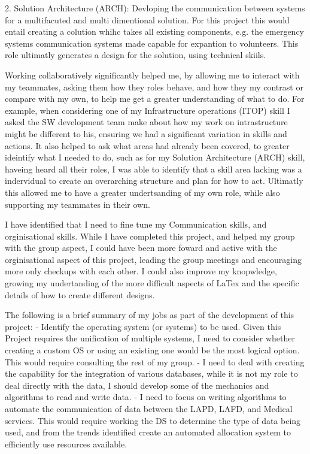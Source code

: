 \documentclass[a4paper, 11pt]{report}
\begin{document}
2. Solution Architecture (ARCH): Devloping the communication between systems for a multifacuted and multi dimentional solution. For this project this would entail creating a colution whihc takes all existing components, e.g. the emergency systems communication systems made capable for expantion to volunteers. This role ultimatly generates a design for the solution, using technical skiils. 

Working collaboratively significantly helped me, by allowing me to interact with my teammates, asking them how they roles behave, and how they my contrast or compare with my own, to help me get a greater understanding of what to do. For example, when considering one of my Infrastructure operations (ITOP) skill I asked the SW development team make about how my work on intrastructure might be different to his, ensuring we had a significant variation in skills and actions. It also helped to ask what areas had already been covered, to greater ideintify what I needed to do, such as for my Solution Architecture (ARCH) skill, haveing heard all their roles, I was able to identify that a skill area lacking was a indervidual to create an overarching structure and plan for how to act. Ultimatly this allowed me to have a greater undertsanding of my own role, while also  supporting my teammates in their own. 

I have identified that I need to fine tune my Communication skills, and orginisational skills. While I have completed this project, and helped my group with the group aspect, I could have been more foward and active with the orginisational aspect of this project, leading the group meetings and encouraging more only checkups with each other. I could also improve my knopwledge, growing my undertanding of the more difficult aspects of LaTex and the specific details of how to create different designs. 

The following is a brief summary of my jobs as part of the development of this project:
- Identify the operating system (or systems) to be used. Given this Project requires the unification of multiple systems, I need to consider whether creating a custom OS or using an existing one would be the most logical option. This would require consulting the rest of my group. 
- I need to deal with creating the capability for the integration of various databases, while it is not my role to deal directly with the data, I should develop some of the mechanics and algorithms to read and write data. 
- I need to focus on writing algorithms to automate the communication of data between the LAPD, LAFD, and Medical services. This would require working the DS to determine the type of data being used, and from the trends identified create an automated allocation system to efficiently use resources available. 
\end{document}
